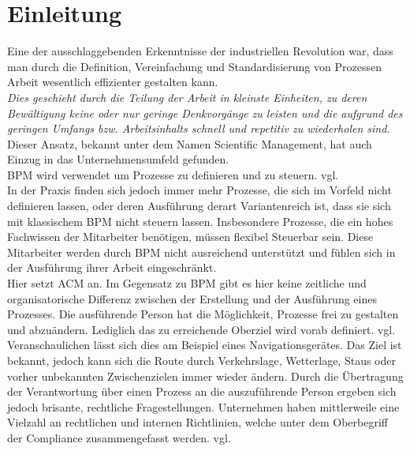 \chapter{Einleitung}
\label{chapter_einleitung}
Eine der ausschlaggebenden Erkenntnisse der industriellen Revolution war, dass 
man durch die Definition, Vereinfachung und Standardisierung von Prozessen Arbeit wesentlich effizienter gestalten kann.
\\
\glqq \emph{Dies geschieht durch die Teilung der Arbeit in kleinste Einheiten, zu deren Bewältigung keine oder nur geringe Denkvorgänge zu leisten und die aufgrund des geringen Umfangs bzw. Arbeitsinhalts schnell und repetitiv zu wiederholen sind.}\grqq{} \cite{Maier.2012} \\
Dieser Ansatz, bekannt unter dem Namen Scientific Management, hat auch Einzug in das Unternehmensumfeld gefunden. \\
\ac{BPM} wird verwendet um Prozesse zu definieren und zu steuern. vgl. \cite{Kiradjiev.} \\
In der Praxis finden sich jedoch immer mehr Prozesse, die sich im Vorfeld nicht definieren lassen, oder deren Ausführung derart Variantenreich ist, dass sie sich mit klassischem \ac{BPM} nicht steuern lassen. Insbesondere Prozesse, die ein hohes Fachwissen der Mitarbeiter benötigen, müssen flexibel Steuerbar sein. Diese Mitarbeiter werden durch \ac{BPM} nicht ausreichend unterstützt und fühlen sich in der Ausführung ihrer Arbeit eingeschränkt.\\
Hier setzt \ac{ACM} an. Im Gegensatz zu \ac{BPM} gibt es hier keine zeitliche und organisatorische Differenz zwischen der Erstellung und der Ausführung eines Prozesses. Die ausführende Person hat die Möglichkeit, Prozesse frei zu gestalten und abzuändern. Lediglich das zu erreichende Oberziel wird vorab definiert. vgl. \cite{Swenson.2012b} \\
Veranschaulichen lässt sich dies am Beispiel eines Navigationsgerätes.
Das Ziel ist bekannt, jedoch kann sich die Route durch Verkehrslage, Wetterlage, Staus oder vorher unbekannten Zwischenzielen immer wieder ändern.
Durch die Übertragung der Verantwortung über einen Prozess an die auszuführende Person ergeben sich jedoch brisante, rechtliche Fragestellungen. Unternehmen haben mittlerweile eine Vielzahl an rechtlichen und internen Richtlinien, welche unter dem Oberbegriff der Compliance zusammengefasst werden. vgl. \cite[s.15]{Walser.2009} \\
